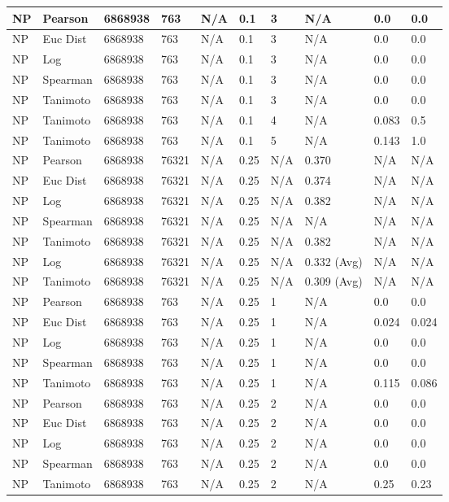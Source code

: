 \documentclass{article}
\begin{document}
\begin{longtable}{ |p{1.7cm}|p{1.9cm}|p{1.5cm}|p{1.5cm}|p{0.75cm}|p{0.75cm}|p{0.75cm}|p{0.75cm}|p{1.5cm}|p{1.5cm}|}
    NP & Pearson & 6868938 & 763 & N/A &  0.1 & 3 & N/A & 0.0 & 0.0  \\ \hline
    NP & Euc Dist & 6868938 & 763 & N/A &  0.1 & 3  & N/A &0.0 & 0.0   \\ \hline
    NP & Log & 6868938 & 763 & N/A &  0.1 & 3  & N/A & 0.0 & 0.0  \\ \hline
    NP & Spearman & 6868938 & 763 & N/A &  0.1 & 3  & N/A &0.0 & 0.0 \\ \hline
    NP & Tanimoto & 6868938 & 763 & N/A &  0.1 & 3 & N/A & 0.0 & 0.0 \\ \hline
    NP & Tanimoto & 6868938 & 763 & N/A &  0.1 &  4 & N/A & 0.083 & 0.5 \\ \hline
    NP & Tanimoto & 6868938 & 763 & N/A &  0.1 &  5 & N/A & 0.143 & 1.0 \\ \hline
    
    NP & Pearson & 6868938 & 76321 & N/A &  0.25 & N/A & 0.370 & N/A & N/A  \\ \hline
    NP & Euc Dist & 6868938 & 76321 & N/A &  0.25 & N/A & 0.374 & N/A & N/A   \\ \hline
    NP & Log & 6868938 & 76321 & N/A &  0.25 & N/A & 0.382 & N/A & N/A  \\ \hline
    NP & Spearman & 6868938 & 76321 & N/A &  0.25 & N/A & N/A & N/A & N/A \\ \hline
    NP & Tanimoto & 6868938 & 76321 & N/A &  0.25 & N/A & 0.382 & N/A & N/A \\ \hline
    NP & Log & 6868938 & 76321 & N/A &  0.25 & N/A & 0.332 (Avg) & N/A & N/A \\ \hline
    NP & Tanimoto & 6868938 & 76321 & N/A &  0.25 & N/A & 0.309 (Avg) & N/A & N/A \\ \hline
    
    NP & Pearson & 6868938 & 763 & N/A &  0.25 & 1 & N/A & 0.0 & 0.0  \\ \hline
    NP & Euc Dist & 6868938 & 763 & N/A &  0.25 & 1 & N/A &0.024 & 0.024   \\ \hline
    NP & Log & 6868938 & 763 & N/A &  0.25 & 1 & N/A & 0.0 & 0.0  \\ \hline
    NP & Spearman & 6868938 & 763 & N/A &  0.25 & 1 & N/A &0.0 & 0.0 \\ \hline
    NP & Tanimoto & 6868938 & 763 & N/A &  0.25 & 1 & N/A & 0.115 & 0.086 \\ \hline
    
    NP & Pearson & 6868938 & 763 & N/A &  0.25 & 2 & N/A & 0.0 & 0.0  \\ \hline
    NP & Euc Dist & 6868938 & 763 & N/A &  0.25 &  2 & N/A &0.0 & 0.0   \\ \hline
    NP & Log & 6868938 & 763 & N/A &  0.25 &  2 & N/A & 0.0 & 0.0 \\ \hline
    NP & Spearman & 6868938 & 763 & N/A &  0.25 &  2 & N/A & 0.0 & 0.0 \\ \hline
    NP & Tanimoto & 6868938 & 763 & N/A &  0.25 &  2 & N/A & 0.25 & 0.23 \\ \hline
    

\end{longtable}
\end{document}
